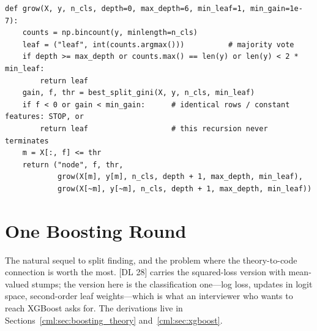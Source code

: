 \begin{lstlisting}
def grow(X, y, n_cls, depth=0, max_depth=6, min_leaf=1, min_gain=1e-7):
    counts = np.bincount(y, minlength=n_cls)
    leaf = ("leaf", int(counts.argmax()))          # majority vote
    if depth >= max_depth or counts.max() == len(y) or len(y) < 2 * min_leaf:
        return leaf
    gain, f, thr = best_split_gini(X, y, n_cls, min_leaf)
    if f < 0 or gain < min_gain:      # identical rows / constant features: STOP, or
        return leaf                   # this recursion never terminates
    m = X[:, f] <= thr
    return ("node", f, thr,
            grow(X[m], y[m], n_cls, depth + 1, max_depth, min_leaf),
            grow(X[~m], y[~m], n_cls, depth + 1, max_depth, min_leaf))
\end{lstlisting}

\section{One Boosting Round}
\label{cml:sec:canon_boosting}

The natural sequel to split finding, and the problem where the theory-to-code connection is worth the most. [DL 28] carries the squared-loss version with mean-valued stumps; the version here is the classification one---log loss, updates in logit space, second-order leaf weights---which is what an interviewer who wants to reach XGBoost asks for. The derivations live in Sections~\ref{cml:sec:boosting_theory} and~\ref{cml:sec:xgboost}.

